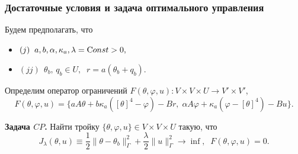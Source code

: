 \begin{frame}
    \frametitle{Достаточные условия и задача оптимального управления}
    Будем предполагать, что
    \begin{itemize}
        \item $(j) \;\; a,b,\alpha,\kappa_a, \lambda ={\textrm Const}> 0,$
        \item $(jj) \;\, \theta_b, \,q_b \in U,\;\; r=a(\theta_b+q_b)$.
    \end{itemize}
    Определим оператор ограничений $F(\theta, \varphi, u) : V \times V \times U \rightarrow V' \times V'$,
    \[
        F(\theta, \varphi, u) = \{ aA\theta + b \kappa_a ( [\theta]^4- \varphi) - Br,\;
        \alpha A \varphi + \kappa_a (\varphi -[\theta]^4) - Bu\}.
    \]


    \textbf{Задача $CP$.} Найти тройку $\{\theta, \varphi, u \} \in V \times V \times U$ такую, что
    \begin{equation}
        \label{eq:2_2:cp}
        J_\lambda(\theta, u) \equiv \frac{1}{2}\|\theta -\theta_b\|^2_\Gamma
        + \frac{\lambda}{2}\|u\|^2_\Gamma \rightarrow \inf,\;\; F(\theta, \varphi, u)=0.
    \end{equation}
\end{frame}



